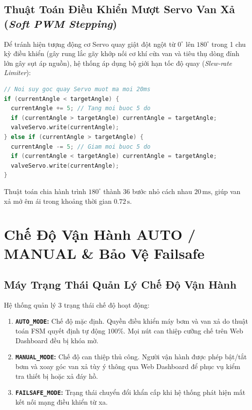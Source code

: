 \clearpage
\subsection{Thuật Toán Điều Khiển Mượt Servo Van Xả (\textit{Soft PWM Stepping})}
Để tránh hiện tượng động cơ Servo quay giật đột ngột từ $0^\circ$ lên $180^\circ$ trong 1 chu kỳ điều khiển (gây rung lắc gãy khớp nối cơ khí cửa van và tiêu thụ dòng đỉnh lớn gây sụt áp nguồn), hệ thống áp dụng bộ giới hạn tốc độ quay (\textit{Slew-rate Limiter}):
\begin{lstlisting}[language=C++]
// Noi suy goc quay Servo muot ma moi 20ms
if (currentAngle < targetAngle) {
  currentAngle += 5; // Tang moi buoc 5 do
  if (currentAngle > targetAngle) currentAngle = targetAngle;
  valveServo.write(currentAngle);
} else if (currentAngle > targetAngle) {
  currentAngle -= 5; // Giam moi buoc 5 do
  if (currentAngle < targetAngle) currentAngle = targetAngle;
  valveServo.write(currentAngle);
}
\end{lstlisting}
Thuật toán chia hành trình $180^\circ$ thành 36 bước nhỏ cách nhau $20\,\text{ms}$, giúp van xả mở êm ái trong khoảng thời gian $0.72\,\text{s}$.

\section{Chế Độ Vận Hành AUTO / MANUAL \& Bảo Vệ Failsafe}
\label{sec:failsafe_mode}

\subsection{Máy Trạng Thái Quản Lý Chế Độ Vận Hành}
Hệ thống quản lý 3 trạng thái chế độ hoạt động:
\begin{enumerate}
    \item \textbf{\texttt{AUTO\_MODE}:} Chế độ mặc định. Quyền điều khiển máy bơm và van xả do thuật toán FSM quyết định tự động $100\%$. Mọi nút can thiệp cưỡng chế trên Web Dashboard đều bị khóa mờ.
    \item \textbf{\texttt{MANUAL\_MODE}:} Chế độ can thiệp thủ công. Người vận hành được phép bật/tắt bơm và xoay góc van xả tùy ý thông qua Web Dashboard để phục vụ kiểm tra thiết bị hoặc xả đáy hồ.
    \item \textbf{\texttt{FAILSAFE\_MODE}:} Trạng thái chuyển đổi khẩn cấp khi hệ thống phát hiện mất kết nối mạng điều khiển từ xa.
\end{enumerate}

